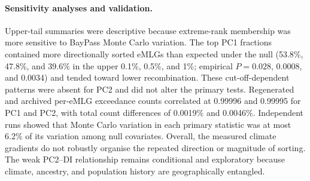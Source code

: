 \paragraph{Sensitivity analyses and validation.} Upper-tail summaries were descriptive
because extreme-rank membership was more sensitive to BayPass Monte Carlo variation. The
top PC1 fractions contained more directionally sorted eMLGs than expected under the null
(53.8\%, 47.8\%, and 39.6\% in the upper 0.1\%, 0.5\%, and 1\%; empirical $P=0.028$,
0.0008, and 0.0034) and tended toward lower recombination. These cut-off-dependent
patterns were absent for PC2 and did not alter the primary tests. Regenerated and archived
per-eMLG exceedance counts correlated at 0.99996 and 0.99995 for PC1 and PC2, with total
count differences of 0.0019\% and 0.0046\%. Independent runs showed that Monte Carlo
variation in each primary statistic was at most 6.2\% of its variation among null
covariates. Overall, the measured climate gradients do not robustly organise the repeated
direction or magnitude of sorting. The weak PC2--DI relationship remains conditional and
exploratory because climate, ancestry, and population history are geographically
entangled.
